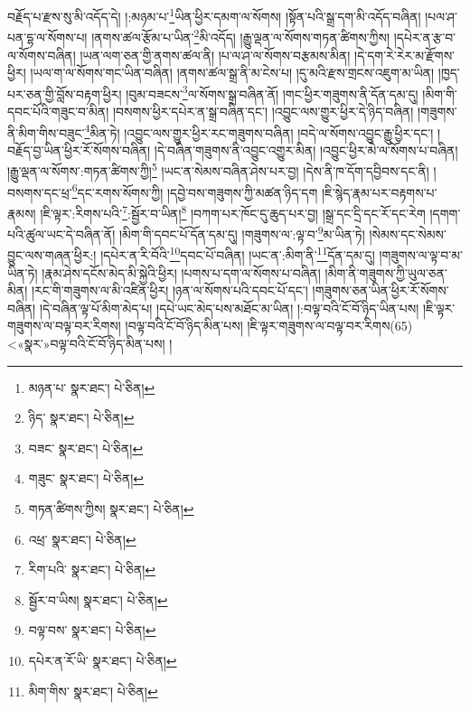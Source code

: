 བརྗོད་པ་རྫས་སུ་མི་འདོད་དེ། །:མཉམ་པ་\footnote{མཉན་པ་  སྣར་ཐང་།  པེ་ཅིན། }ཡིན་ཕྱིར་དམག་ལ་སོགས། །སྟོན་པའི་སྒྲ་དག་མི་འདོད་བཞིན། །པལ་ཤ་པན་དྷ་ལ་སོགས་པ། །ནགས་ཚལ་རྩོམ་པ་ཡིན་\footnote{ཉིད་  སྣར་ཐང་།  པེ་ཅིན། }མི་འདོད། །རྒྱུ་ལྡན་ལ་སོགས་གཏན་ཚིགས་ཀྱིས། །དཔེར་ན་རྩ་བ་ལ་སོགས་བཞིན། །ཡན་ལག་ཅན་གྱི་ནགས་ཚལ་ནི། །པ་ལ་ཤ་ལ་སོགས་བརྩམས་མིན། །དེ་དག་རེ་རེར་མ་རྫོགས་ཕྱིར། །ཡལ་ག་ལ་སོགས་གང་ཡིན་བཞིན། །ནགས་ཚལ་སྒྲ་ནི་མ་ངེས་པ། །དུ་མའི་རྫས་གྲངས་འཇུག་མ་ཡིན། །ཁྱད་པར་ཅན་གྱི་བློས་བརྟག་ཕྱིར། །བུམ་བཟངས་\footnote{བཟང་  སྣར་ཐང་།  པེ་ཅིན། }ལ་སོགས་སྒྲ་བཞིན་ནོ། །གང་ཕྱིར་གཟུགས་ནི་དོན་དམ་དུ། །མིག་གི་དབང་པོའི་གཟུང་བ་མིན། །བསགས་ཕྱིར་དཔེར་ན་སྒྲ་བཞིན་དང་། །འབྱུང་ལས་གྱུར་ཕྱིར་དེ་ཉིད་བཞིན། །གཟུགས་ནི་མིག་གིས་བཟུང་\footnote{གཟུང་  སྣར་ཐང་།  པེ་ཅིན། }མིན་ཏེ། །འབྱུང་ལས་གྱུར་ཕྱིར་རང་གཟུགས་བཞིན། །བདེ་ལ་སོགས་འབྱུང་རྒྱུ་ཕྱིར་དང་། །བརྗོད་བྱ་ཡིན་ཕྱིར་རོ་སོགས་བཞིན། །དེ་བཞིན་གཟུགས་ནི་འབྱུང་འགྱུར་མིན། །འབྱུང་ཕྱིར་མེ་ལ་སོགས་པ་བཞིན། །རྒྱུ་ལྡན་ལ་སོགས་:གཏན་ཚིགས་ཀྱི།\footnote{གཏན་ཚིགས་ཀྱིས།  སྣར་ཐང་།  པེ་ཅིན། } །ཡང་ན་སེམས་བཞིན་ཤེས་པར་བྱ། །དེས་ནི་ཁ་དོག་དབྱིབས་དང་ནི། །བསགས་དང་ཕྲ་\footnote{འཕྲ་  སྣར་ཐང་།  པེ་ཅིན། }དང་རགས་སོགས་ཀྱི། །དབྱེ་བས་གཟུགས་ཀྱི་མཚན་ཉིད་དག །ཇི་སྙེད་རྣམ་པར་བརྟགས་པ་རྣམས། །ཇི་ལྟར་:རིགས་པའི་\footnote{རིག་པའི་  སྣར་ཐང་།  པེ་ཅིན། }:སྦྱོར་བ་ཡིན།\footnote{སྦྱོར་བ་ཡིས།  སྣར་ཐང་།  པེ་ཅིན། } །བཀག་པར་ཁོང་དུ་ཆུད་པར་བྱ། །སྒྲ་དང་དྲི་དང་རོ་དང་རེག །དགག་པའི་ཚུལ་ཡང་དེ་བཞིན་ནོ། །མིག་གི་དབང་པོ་དོན་དམ་དུ། །གཟུགས་ལ་:ལྟ་བ་\footnote{བལྟ་བས་  སྣར་ཐང་།  པེ་ཅིན། }མ་ཡིན་ཏེ། །སེམས་དང་སེམས་བྱུང་ལས་གཞན་ཕྱིར:། །དཔེར་ན་རི་བོའི་\footnote{དཔེར་ན་རོ་ཡི་  སྣར་ཐང་།  པེ་ཅིན། }དབང་པོ་བཞིན། །ཡང་ན་:མིག་ནི་\footnote{མིག་གིས་  སྣར་ཐང་།  པེ་ཅིན། }དོན་དམ་དུ། །གཟུགས་ལ་ལྟ་བ་མ་ཡིན་ཏེ། །རྣམ་ཤེས་དངོས་མེད་མི་སྐྱེའི་ཕྱིར། །པགས་པ་དག་ལ་སོགས་པ་བཞིན། །མིག་ནི་གཟུགས་ཀྱི་ཡུལ་ཅན་མིན། །རང་གི་གཟུགས་ལ་མི་འཛིན་ཕྱིར། །ཉན་ལ་སོགས་པའི་དབང་པོ་དང་། །གཟུགས་ཅན་ཡིན་ཕྱིར་རོ་སོགས་བཞིན། །དེ་བཞིན་ལྟ་པོ་མིག་མེད་པ། །དཔེ་ཡང་མེད་པས་མཐོང་མ་ཡིན། །:བལྟ་བའི་ངོ་བོ་ཉིད་ཡིན་པས། །ཇི་ལྟར་གཟུགས་ལ་བལྟ་བར་རིགས། །བལྟ་བའི་ངོ་བོ་ཉིད་མིན་པས། །ཇི་ལྟར་གཟུགས་ལ་བལྟ་བར་རིགས(65) <«སྣར་»བལྟ་བའི་ངོ་བོ་ཉིད་མིན་པས། །
